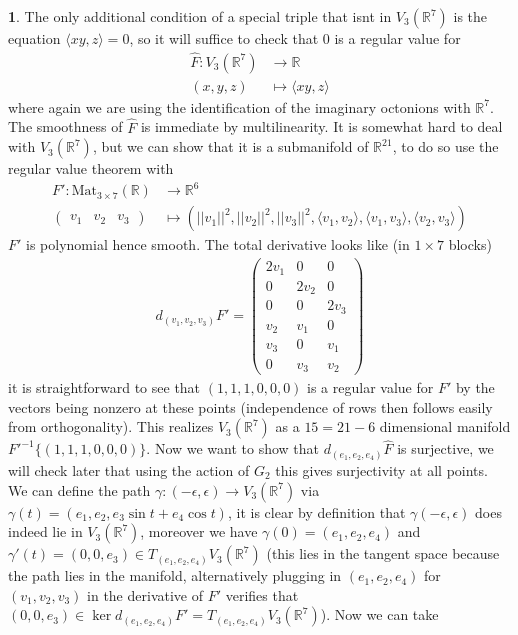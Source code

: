 \documentclass[10.5pt]{article}
\theoremstyle{definition}
\newtheorem{pb}{}
\newcommand{\set}[1]{\{#1\}}
\newcommand{\gen}[1]{\langle#1\rangle}
\newcommand{\norm}[1]{\lvert\lvert#1\rvert\rvert}
\begin{document}
\begin{pb}
        The only additional condition of a special triple that isnt in \(V_3(\mathbb{R}^7)\) is the equation \(\gen{xy,z} = 0\), so it will suffice to check that \(0\) is a regular value for
        \begin{align*}
            \hat{F}: V_3(\mathbb{R}^7) &\to \mathbb{R} \\
            (x,y,z) &\mapsto \gen{xy,z}
        \end{align*}
        where again we are using the identification of the imaginary octonions with \(\mathbb{R}^7\). The smoothness of \(\hat{F}\) is immediate by multilinearity. It is somewhat hard to deal with \(V_3(\mathbb{R}^7)\), but we can show that it is a submanifold of \(\mathbb{R}^{21}\), to do so use the regular value theorem with
        \begin{align*}
            F': \text{Mat}_{3\times 7}(\mathbb{R}) &\to \mathbb{R}^6 \\
            \begin{pmatrix} v_1&v_2&v_3 \end{pmatrix} &\mapsto (\norm{v_1}^2,\norm{v_2}^2,\norm{v_3}^2,\gen{v_1,v_2},\gen{v_1,v_3},\gen{v_2,v_3})
        \end{align*}
        \(F'\) is polynomial hence smooth. The total derivative looks like (in \(1 \times 7\) blocks)
        \begin{align*}
            d_{(v_1,v_2,v_3)}F' = \begin{pmatrix} 2v_1 & 0 & 0 \\ 0 & 2v_2 & 0 \\ 0&0& 2v_3 \\ v_2 & v_1 & 0 \\ v_3 & 0 & v_1 \\ 0 & v_3 & v_2 \end{pmatrix}
        \end{align*}
        it is straightforward to see that \((1,1,1,0,0,0)\) is a regular value for \(F'\) by the vectors being nonzero at these points (independence of rows then follows easily from orthogonality). This realizes \(V_3(\mathbb{R}^7)\) as a \(15 = 21 - 6\) dimensional manifold \(F'^{-1}\set{(1,1,1,0,0,0)}\). Now we want to show that \(d_{(e_1,e_2,e_4)}\hat{F}\) is surjective, we will check later that using the action of \(G_2\) this gives surjectivity at all points. We can define the path \(\gamma: (-\epsilon,\epsilon) \to V_3(\mathbb{R}^7)\) via \(\gamma(t) = (e_1,e_2,e_3\sin t + e_4\cos t)\), it is clear by definition that \(\gamma(-\epsilon,\epsilon)\) does indeed lie in \(V_3(\mathbb{R}^7)\), moreover we have \(\gamma(0) = (e_1,e_2,e_4)\) and \(\gamma'(t) = (0,0,e_3) \in T_{(e_1,e_2,e_4)}V_3(\mathbb{R}^7)\) (this lies in the tangent space because the path lies in the manifold, alternatively plugging in \((e_1,e_2,e_4)\) for \((v_1,v_2,v_3)\) in the derivative of \(F'\) verifies that \((0,0,e_3) \in \ker d_{(e_1,e_2,e_4)}F' = T_{(e_1,e_2,e_4)}V_3(\mathbb{R}^7)\)). Now we can take 

\end{pb}
\end{document}
